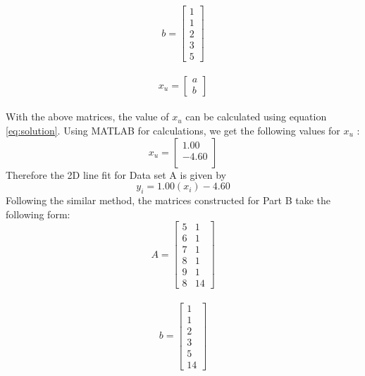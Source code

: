 \documentclass[12pt]{article}
\begin{document}
\begin{equation}
b  = 
	\begin{bmatrix}
	1 \\
	1 \\
	2 \\
	3 \\
	5
	\end{bmatrix}
\end{equation}\\
\begin{equation}
x_u  = 
	\begin{bmatrix}
	a \\
	b
	\end{bmatrix}
\end{equation} \\
With the above matrices, the value of $x_u$ can be calculated using equation \ref{eq:solution}. Using MATLAB for calculations, we get the following values for $x_u$ : 
\begin{equation}
x_u = 
	\begin{bmatrix}
	 1.00\\
	-4.60 \\
	\end{bmatrix}
\end{equation}
\noindent
Therefore the 2D line fit for Data set A is given by 
\begin{equation}
y_i = 1.00(x_i) - 4.60
\label{ans:A}
\end{equation} 
\noindent
Following the similar method, the matrices constructed for Part B take the following form:
\begin{equation}
A  = 
	\begin{bmatrix}
	5 & 1 \\
	6 & 1 \\
	7 & 1 \\
	8 & 1\\
	9 & 1\\
	8 & 14
	\end{bmatrix}
\end{equation} \\
\begin{equation}
b = 
	\begin{bmatrix}
	1 \\
	1 \\
	2 \\
	3 \\
	5 \\
	14
	\end{bmatrix}
\end{equation}\\
\end{document}
